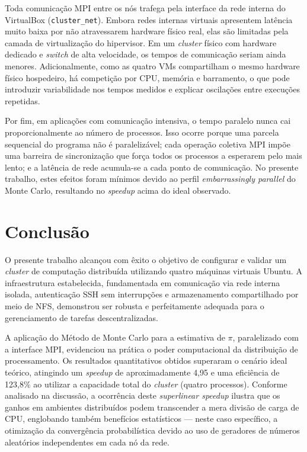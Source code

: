 \documentclass[
	12pt,
	oneside,
	a4paper,
	chapter=TITLE,
	section=TITLE,
	english,
	brazil,
	sumario=tradicional
]{abntex2}
\begin{document}
Toda comunicação MPI entre os nós trafega pela interface
da rede interna do VirtualBox
(\texttt{cluster\_net}). Embora redes internas virtuais
apresentem latência muito baixa por não atravessarem hardware
físico real, elas são limitadas pela camada de virtualização
do hipervisor. Em um \textit{cluster} físico com hardware dedicado e
\textit{switch} de alta velocidade, os tempos de comunicação seriam
ainda menores. Adicionalmente, como as quatro VMs compartilham
o mesmo hardware físico hospedeiro, há competição por CPU,
memória e barramento, o que pode introduzir variabilidade nos
tempos medidos e explicar oscilações entre execuções repetidas.

Por fim, em aplicações com comunicação intensiva, o tempo paralelo nunca cai proporcionalmente ao número de processos. Isso ocorre porque uma parcela sequencial do programa não é paralelizável; cada operação coletiva MPI impõe uma barreira de sincronização que força todos os processos a
esperarem pelo mais lento; e a latência de rede
acumula-se a cada ponto de comunicação. No presente trabalho,
estes efeitos foram mínimos devido ao perfil
\textit{embarrassingly parallel} do Monte Carlo, resultando
no \textit{speedup} acima do ideal observado.

\section{Conclusão}
O presente trabalho alcançou com êxito o objetivo de configurar e validar um \textit{cluster} de computação distribuída utilizando quatro máquinas virtuais Ubuntu. A infraestrutura estabelecida, fundamentada em comunicação via rede interna isolada, autenticação SSH sem interrupções e armazenamento compartilhado por meio de NFS, demonstrou ser robusta e perfeitamente adequada para o gerenciamento de tarefas descentralizadas.

A aplicação do Método de Monte Carlo para a estimativa de $\pi$, paralelizado com a interface MPI, evidenciou na prática o poder computacional da distribuição de processamento. Os resultados quantitativos obtidos superaram o cenário ideal teórico, atingindo um \textit{speedup} de aproximadamente 4,95 e uma eficiência de 123,8\% ao utilizar a capacidade total do \textit{cluster} (quatro processos). Conforme analisado na discussão, a ocorrência deste \textit{superlinear speedup} ilustra que os ganhos em ambientes distribuídos podem transcender a mera divisão de carga de CPU, englobando também benefícios estatísticos — neste caso específico, a otimização da convergência probabilística devido ao uso de geradores de números aleatórios independentes em cada nó da rede.
\end{document}
